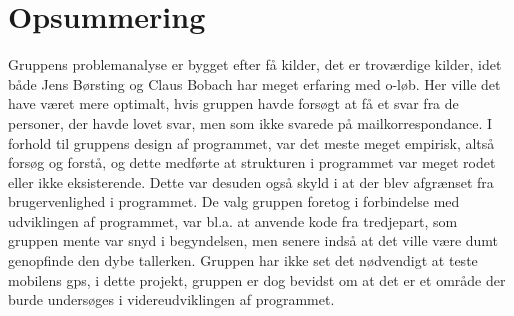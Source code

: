 \section{Opsummering}
Gruppens problemanalyse er bygget efter få kilder, det er troværdige kilder, idet både Jens Børsting og Claus Bobach har meget erfaring med o-løb. Her ville det have været mere optimalt, hvis gruppen havde forsøgt at få et svar fra de personer, der havde lovet svar, men som ikke svarede på mailkorrespondance. \newline
I forhold til gruppens design af programmet, var det meste meget empirisk, altså forsøg og forstå, og dette medførte at strukturen i programmet var meget rodet eller ikke eksisterende. Dette var desuden også skyld i at der blev afgrænset fra brugervenlighed i programmet. \newline
De valg gruppen foretog i forbindelse med udviklingen af programmet, var bl.a. at anvende kode fra tredjepart, som gruppen mente var snyd i begyndelsen, men senere indså at det ville være dumt genopfinde den dybe tallerken.
Gruppen har ikke set det nødvendigt at teste mobilens gps, i dette projekt, gruppen er dog bevidst om at det er et område der burde undersøges i videreudviklingen af programmet.


